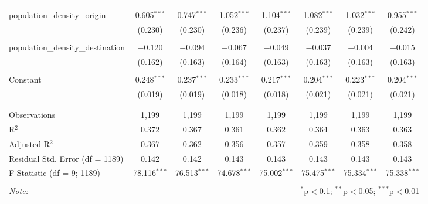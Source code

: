 \begin{table}[!htbp]
\begin{tabular}{@{\extracolsep{5pt}}lccccccc}
  & & & & & & & \\ 
 population\_density\_origin & 0.605$^{***}$ & 0.747$^{***}$ & 1.052$^{***}$ & 1.104$^{***}$ & 1.082$^{***}$ & 1.032$^{***}$ & 0.955$^{***}$ \\ 
  & (0.230) & (0.230) & (0.236) & (0.237) & (0.239) & (0.239) & (0.242) \\ 
  & & & & & & & \\ 
 population\_density\_destination & $-$0.120 & $-$0.094 & $-$0.067 & $-$0.049 & $-$0.037 & $-$0.004 & $-$0.015 \\ 
  & (0.162) & (0.163) & (0.164) & (0.163) & (0.163) & (0.163) & (0.163) \\ 
  & & & & & & & \\ 
 Constant & 0.248$^{***}$ & 0.237$^{***}$ & 0.233$^{***}$ & 0.217$^{***}$ & 0.204$^{***}$ & 0.223$^{***}$ & 0.204$^{***}$ \\ 
  & (0.019) & (0.019) & (0.018) & (0.018) & (0.021) & (0.021) & (0.021) \\ 
  & & & & & & & \\ 
\hline \\[-1.8ex] 
Observations & 1,199 & 1,199 & 1,199 & 1,199 & 1,199 & 1,199 & 1,199 \\ 
R$^{2}$ & 0.372 & 0.367 & 0.361 & 0.362 & 0.364 & 0.363 & 0.363 \\ 
Adjusted R$^{2}$ & 0.367 & 0.362 & 0.356 & 0.357 & 0.359 & 0.358 & 0.358 \\ 
Residual Std. Error (df = 1189) & 0.142 & 0.142 & 0.143 & 0.143 & 0.143 & 0.143 & 0.143 \\ 
F Statistic (df = 9; 1189) & 78.116$^{***}$ & 76.513$^{***}$ & 74.678$^{***}$ & 75.002$^{***}$ & 75.475$^{***}$ & 75.334$^{***}$ & 75.338$^{***}$ \\ 
\hline 
\hline \\[-1.8ex] 
\textit{Note:}  & \multicolumn{7}{r}{$^{*}$p$<$0.1; $^{**}$p$<$0.05; $^{***}$p$<$0.01} \\ 
\end{tabular} 
\end{table} 
